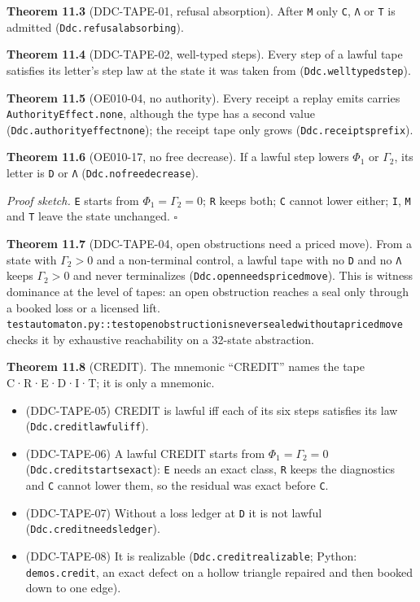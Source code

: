\documentclass[
  11pt,
]{article}
\providecommand{\tightlist}{%
  \setlength{\itemsep}{0pt}\setlength{\parskip}{0pt}}
\renewcommand{\_}{\ddcunderscore\allowbreak}
\begin{document}
\textbf{Theorem 11.3} (DDC-TAPE-01, refusal absorption). After
\texttt{M} only \texttt{C}, \texttt{Λ} or \texttt{T} is admitted
(\texttt{Ddc.\allowbreak refusal\_absorbing}).

\textbf{Theorem 11.4} (DDC-TAPE-02, well-typed steps). Every step of a
lawful tape satisfies its letter's step law at the state it was taken
from (\texttt{Ddc.\allowbreak well\_typed\_step}).

\textbf{Theorem 11.5} (OE010-04, no authority). Every receipt a replay
emits carries \texttt{Authority\allowbreak Effect.\allowbreak none}, although the type has a
second value (\texttt{Ddc.\allowbreak authority\_effect\_none}); the receipt tape
only grows (\texttt{Ddc.\allowbreak receipts\_prefix}).

\textbf{Theorem 11.6} (OE010-17, no free decrease). If a lawful step
lowers \(\Phi_1\) or \(\Gamma_2\), its letter is \texttt{D} or
\texttt{Λ} (\texttt{Ddc.\allowbreak no\_free\_decrease}).

\emph{Proof sketch.} \texttt{E} starts from \(\Phi_1 = \Gamma_2 = 0\);
\texttt{R} keeps both; \texttt{C} cannot lower either; \texttt{I},
\texttt{M} and \texttt{T} leave the state unchanged. \(\square\)

\textbf{Theorem 11.7} (DDC-TAPE-04, open obstructions need a priced
move). From a state with \(\Gamma_2 > 0\) and a non-terminal control, a
lawful tape with no \texttt{D} and no \texttt{Λ} keeps \(\Gamma_2 > 0\)
and never terminalizes (\texttt{Ddc.\allowbreak open\_needs\_priced\_move}). This is
witness dominance at the level of tapes: an open obstruction reaches a
seal only through a booked loss or a licensed lift.
\texttt{test\_automaton.\allowbreak py::test\_open\_obstruction\_is\_never\_sealed\_without\_a\_priced\_move}
checks it by exhaustive reachability on a 32-state abstraction.

\textbf{Theorem 11.8} (CREDIT). The mnemonic ``CREDIT'' names the tape
C·R·E·D·I·T; it is only a mnemonic.

\begin{itemize}
\tightlist
\item
  (DDC-TAPE-05) CREDIT is lawful iff each of its six steps satisfies its
  law (\texttt{Ddc.\allowbreak credit\_lawful\_iff}).
\item
  (DDC-TAPE-06) A lawful CREDIT starts from \(\Phi_1 = \Gamma_2 = 0\)
  (\texttt{Ddc.\allowbreak credit\_starts\_exact}): \texttt{E} needs an exact class,
  \texttt{R} keeps the diagnostics and \texttt{C} cannot lower them, so
  the residual was exact before \texttt{C}.
\item
  (DDC-TAPE-07) Without a loss ledger at \texttt{D} it is not lawful
  (\texttt{Ddc.\allowbreak credit\_needs\_ledger}).
\item
  (DDC-TAPE-08) It is realizable (\texttt{Ddc.\allowbreak credit\_realizable};
  Python: \texttt{demos.\allowbreak credit}, an exact defect on a hollow triangle
  repaired and then booked down to one edge).
\end{itemize}
\end{document}
